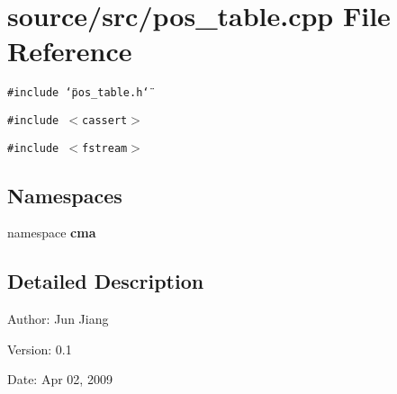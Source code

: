 \section{source/src/pos\_\-table.cpp File Reference}
\label{pos__table_8cpp}
{\tt \#include \char`\"{}pos\_\-table.h\char`\"{}}\par
{\tt \#include $<$cassert$>$}\par
{\tt \#include $<$fstream$>$}\par
\subsection*{Namespaces}
\begin{CompactItemize}
\item 
namespace \textbf{cma}
\end{CompactItemize}


\subsection{Detailed Description}
\begin{Desc}
\item[Author:]Jun Jiang \end{Desc}
\begin{Desc}
\item[Version:]0.1 \end{Desc}
\begin{Desc}
\item[Date:]Apr 02, 2009 \end{Desc}
